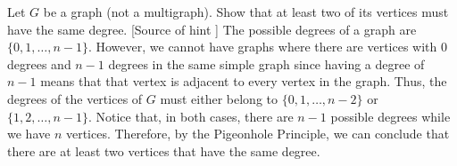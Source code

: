 \begin{hwproblem}{2}{
    Let $G$ be a graph (not a multigraph). Show that at least two of its 
    vertices must have the same degree.
  }
  [Source of hint \cite{p2-1}] The possible degrees of a graph are \(\{0, 1,
  \ldots, n-1\}\). However, we cannot have graphs where there are vertices with
  0 degrees and \(n-1\) degrees in the same simple graph since having a degree
  of \(n-1\) means that that vertex is adjacent to every vertex in the graph.
  Thus, the degrees of the vertices of \(G\) must either belong to \(\{0, 1, 
  \ldots, n-2\}\) or \(\{1, 2, \ldots, n-1\}\). Notice that, in both cases,
  there are \(n-1\) possible degrees while we have \(n\) vertices. Therefore, by
  the Pigeonhole Principle, we can conclude that there are at least two vertices
  that have the same degree.
\end{hwproblem}
